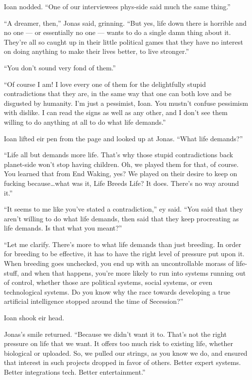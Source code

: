 Ioan nodded. ``One of our interviewees phys-side said much the same thing.''

``A dreamer, then,'' Jonas said, grinning. ``But yes, life down there is horrible and no one — or essentially no one — wants to do a single damn thing about it. They're all so caught up in their little political games that they have no interest on doing anything to make their lives better, to live stronger.''

``You don't sound very fond of them.''

``Of course I am! I love every one of them for the delightfully stupid contradictions that they are, in the same way that one can both love and be disgusted by humanity. I'm just a pessimist, Ioan. You mustn't confuse pessimism with dislike. I can read the signs as well as any other, and I don't see them willing to do anything at all to do what life demands.''

Ioan lifted eir pen from the page and looked up at Jonas. ``What life demands?''

``Life all but demands more life. That's why those stupid contradictions back planet-side won't stop having children. Oh, we played them for that, of course. You learned that from End Waking, yes? We played on their desire to keep on fucking because\ldots what was it, Life Breeds Life? It does. There's no way around it.''

``It seems to me like you've stated a contradiction,'' ey said. ``You said that they aren't willing to do what life demands, then said that they keep procreating as life demands. Is that what you meant?''

``Let me clarify. There's more to what life demands than just breeding. In order for breeding to be effective, it has to have the right level of pressure put upon it. When breeding goes unchecked, you end up with an uncontrollable morass of life-stuff, and when that happens, you're more likely to run into systems running out of control, whether those are political systems, social systems, or even technological systems. Do you know why the race towards developing a true artificial intelligence stopped around the time of Secession?''

Ioan shook eir head.

Jonas's smile returned. ``Because we didn't want it to. That's not the right pressure on life that we want. It offers too much risk to existing life, whether biological or uploaded. So, we pulled our strings, as you know we do, and ensured that interest in such projects dropped in favor of others. Better expert systems. Better integrations tech. Better entertainment.''

